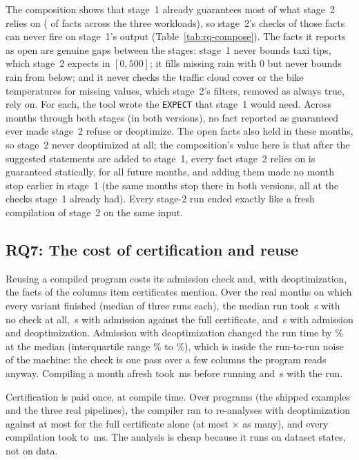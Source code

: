 

The composition shows that stage~1 already guarantees most of what stage~2 relies on
(\ComposeGuaranteed{} of \ComposeFacts{} facts across the three workloads), so stage~2's checks of
those facts can never fire on stage~1's output (Table~\ref{tab:rq-compose}). The facts it reports as
open are genuine gaps between the stages: stage~1 never bounds taxi tips, which stage~2 expects in
$[0,500]$; it fills missing rain with 0 but never bounds rain from below; and it never checks the
traffic cloud cover or the bike temperatures for missing values, which stage~2's filters, removed as
always true, rely on. For each, the tool wrote the \texttt{EXPECT} that stage~1 would need. Across
\ComposeMonths{} months through both stages (in both versions), no fact reported as guaranteed ever
made stage~2 refuse or deoptimize. The open facts also held in these months, so stage~2 never
deoptimized at all; the composition's value here is that after the suggested statements are added to
stage~1, every fact stage~2 relies on is guaranteed statically, for all future months, and adding
them made no month stop earlier in stage~1 (the same \ComposeStageOneStops{} months stop there in both
versions, all at the checks stage~1 already had). Every stage-2 run ended exactly like a fresh
compilation of stage~2 on the same input.

\subsection{RQ7: The cost of certification and reuse}\label{sec:rq-cost}

Reusing a compiled program costs its admission check and, with deoptimization, the facts of the columns
item certificates mention. Over the \OhMonths{} real months on which every variant finished (median of
three runs each), the median run took \OhTrusted\,s with no check at all, \OhFull\,s with admission
against the full certificate, and \OhDeopt\,s with admission and deoptimization. Admission with
deoptimization changed the run time by \OhPct\% at the median (interquartile range \OhPctLow\% to
\OhPctHigh\%), which is inside the run-to-run noise of the machine: the check is one pass over a few
columns the program reads anyway. Compiling a month afresh took \OhCompileMs\,ms before running and \OhFresh\,s with the run.

Certification is paid once, at compile time. Over \CcPrograms{} programs (the shipped examples and
the three real pipelines), the compiler ran \CcAnalysesMin{} to \CcAnalysesMax{} re-analyses with
deoptimization against at most \CcFullAnalysesMax{} for the full certificate alone (at most
\CcRatioMax$\times$ as many), and every compilation took \CcMsMin{} to \CcMsMax\,ms. The analysis is
cheap because it runs on dataset states, not on data.

